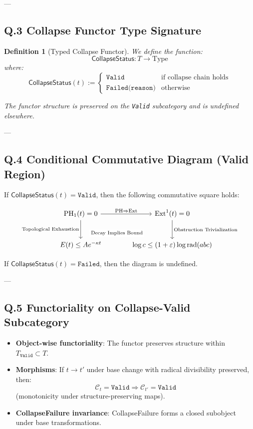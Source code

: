 \documentclass[11pt]{article}
\newtheorem{definition}[theorem]{Definition}
\DeclareMathOperator{\Ext}{Ext}
\DeclareMathOperator{\PH}{PH}
\begin{document}
---

\subsection*{Q.3 Collapse Functor Type Signature}

\begin{definition}[Typed Collapse Functor]
We define the function:
\[
\mathsf{CollapseStatus} : T \to \mathrm{Type}
\]
where:
\[
\mathsf{CollapseStatus}(t) := 
\begin{cases}
  \texttt{Valid} & \text{if collapse chain holds} \\
  \texttt{Failed(reason)} & \text{otherwise}
\end{cases}
\]

The functor structure is preserved on the \texttt{Valid} subcategory and is undefined elsewhere.
\end{definition}

---

\subsection*{Q.4 Conditional Commutative Diagram (Valid Region)}

If \( \mathsf{CollapseStatus}(t) = \texttt{Valid} \), then the following commutative square holds:

\[
\begin{tikzcd}[row sep=large, column sep=large]
\PH_1(t) = 0
  \arrow[r, "\text{PH} \Rightarrow \Ext"]
  \arrow[d, swap, "\text{Topological Exhaustion}"]
& \Ext^1(t) = 0
  \arrow[d, "\text{Obstruction Trivialization}"] \\
E(t) \leq Ae^{-\kappa t}
  \arrow[r, "\text{Decay Implies Bound}" description, yshift=4.0ex]
& \log c \leq (1+\varepsilon)\log \mathrm{rad}(abc)
\end{tikzcd}
\]


If \( \mathsf{CollapseStatus}(t) = \texttt{Failed} \), then the diagram is undefined.

---

\subsection*{Q.5 Functoriality on Collapse-Valid Subcategory}

\begin{itemize}
  \item \textbf{Object-wise functoriality}: The functor preserves structure within \( T_{\texttt{Valid}} \subset T \).
  \item \textbf{Morphisms}: If \( t \to t' \) under base change with radical divisibility preserved,  
  then:
  \[
  \mathcal{C}_{t} = \texttt{Valid} \Rightarrow \mathcal{C}_{t'} = \texttt{Valid}
  \]
  (monotonicity under structure-preserving maps).
  \item \textbf{CollapseFailure invariance}: CollapseFailure forms a closed subobject under base transformations.
\end{itemize}
\end{document}
